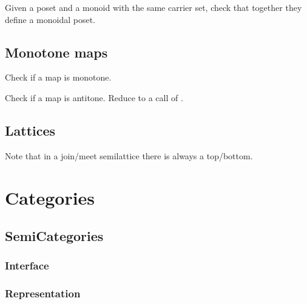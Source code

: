 \begin{exercise}

\begin{exercise}
Given a poset and a monoid with the same carrier set, check that together they define a monoidal poset.

\end{exercise}


\section{Monotone maps}




\begin{exercise}
Check if a map is monotone.

\end{exercise}


\begin{exercise}
Check if a map is antitone. Reduce to a call of .

\end{exercise}


\section{Lattices}





Note that in a join/meet semilattice there is always a top/bottom.


\chapter{Categories}


\section{SemiCategories}
\subsection*{Interface}

\subsection*{Representation}



\end{exercise}
